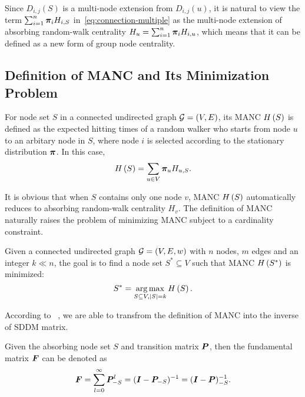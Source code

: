 \documentclass[sigconf]{acmart}
\begin{document}
Since \(D_{i,j}(S)\) is a multi-node extension from \(D_{i,j}(u)\), it is natural to view the term \(\sum_{i=1}^n\boldsymbol{\pi}_iH_{i,S}\) in~\eqref{eq:connection-multiple} as the multi-node extension of absorbing random-walk centrality \(H_u=\sum_{i=1}^n\boldsymbol{\pi}_iH_{i,u}\), which means that it can be defined as a new form of group node centrality.

\subsection{Definition of MANC and Its Minimization Problem}\label{subsec:def-manc}


\begin{definition}\label{def:manc}
  For node set \(S\) in a connected undirected graph \(\mathcal{G}=(V,E)\), its MANC \(H\left(S\right)\) is defined as the expected hitting times of a random walker who starts from node \(u\) to an arbitary node in \(S\), where node \(i\) is selected according to the stationary distribution \(\boldsymbol{\pi}\).
  In this case,
  \[H\left(S\right)=\sum_{u\in V}\boldsymbol{\pi}_u H_{u,S}.\]
\end{definition}

It is obvious that when \(S\) contains only one node \(v\), MANC \(H\left(S\right)\) automatically reduces to absorbing random-walk centrality \(H_v\).
The definition of MANC naturally raises the problem of minimizing MANC subject to a cardinality constraint.

\begin{problem}
Given a connected undirected graph \(\mathcal{G}=(V,E,w)\) with \(n\) nodes, \(m\) edges and an integer \(k\ll n\), the goal is to find a node set \(S^*\subseteq V\) such that MANC \(H\left(S^*\right)\) is minimized:
\[S^*=\operatorname*{arg\,max}_{S\subseteq V,\left|S \right|=k}H\left(S\right).\]
\end{problem}

According to ~\cite{KeSn76}, we are able to transfrom the definition of MANC into the inverse of SDDM matrix.

\begin{fact}
  Given the absorbing node set \(S\) and transition matrix \(\boldsymbol{P}\), then the fundamental matrix \(\boldsymbol{F}\) can be denoted as
  \begin{equation}\label{eq:funda}
    \boldsymbol{F}=\sum_{l=0}^\infty\boldsymbol{P}_{-S}^l=(\boldsymbol{I}-\boldsymbol{P}_{-S})^{-1}=(\boldsymbol{I}-\boldsymbol{P})_{-S}^{-1}.
  \end{equation}
\end{fact}
\end{document}
